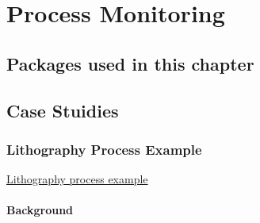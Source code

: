 \documentclass[]{book}
\newenvironment{Shaded}{\begin{snugshade}}{\end{snugshade}}
\newcommand{\CommentTok}[1]{\textcolor[rgb]{0.56,0.35,0.01}{\textit{#1}}}
\newcommand{\KeywordTok}[1]{\textcolor[rgb]{0.13,0.29,0.53}{\textbf{#1}}}
\newcommand{\NormalTok}[1]{#1}
\theoremstyle{definition}
\theoremstyle{definition}
\theoremstyle{definition}
\theoremstyle{remark}
\begin{document}
\hypertarget{process-monitoring}{%
\chapter{Process Monitoring}\label{process-monitoring}}

\hypertarget{packages-used-in-this-chapter-3}{%
\section{Packages used in this
chapter}\label{packages-used-in-this-chapter-3}}

\begin{Shaded}
\end{Shaded}

\hypertarget{case-stuidies-2}{%
\section{Case Stuidies}\label{case-stuidies-2}}

\hypertarget{lithography-process-example}{%
\subsection{Lithography Process
Example}\label{lithography-process-example}}

\href{https://www.itl.nist.gov/div898/handbook/pmc/section6/pmc61.htm}{Lithography
process example}

\hypertarget{background-1}{%
\subsubsection{Background}\label{background-1}}
\end{document}
